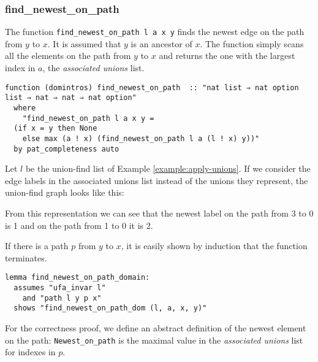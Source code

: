 \subsubsection{find\_newest\_on\_path}

The function \lstinline{find_newest_on_path l a x y} finds the newest edge on the path from $y$ to $x$. It is assumed that $y$ is an ancestor of $x$. The function simply scans all the elements on the path from $y$ to $x$ and returns the one with the largest index in $a$, the \emph{associated unions} list.

\begin{lstlisting}
function (domintros) find_newest_on_path  :: "nat list ⇒ nat option list ⇒ nat ⇒ nat ⇒ nat option"
  where
    "find_newest_on_path l a x y =
  (if x = y then None
    else max (a ! x) (find_newest_on_path l a (l ! x) y))"
  by pat_completeness auto
\end{lstlisting}

\begin{exmp}
Let $l$ be the union-find list of Example \ref{example:apply-unions}. If we consider the edge labels in the associated unions list instead of the unions they represent, the union-find graph looks like this:

\begin{center}
\end{center}

From this representation we can see that the newest label on the path from 3 to 0 is 1 and on the path from 1 to 0 it is 2.
\end{exmp}

If there is a path $p$ from $y$ to $x$, it is easily shown by induction that the function terminates.

\begin{lstlisting}
lemma find_newest_on_path_domain:
  assumes "ufa_invar l"
    and "path l y p x"
  shows "find_newest_on_path_dom (l, a, x, y)"
\end{lstlisting}

For the correctness proof, we define an abstract definition of the newest element on the path: \lstinline{Newest_on_path} is the maximal value in the \emph{associated unions} list for indexes in $p$.

